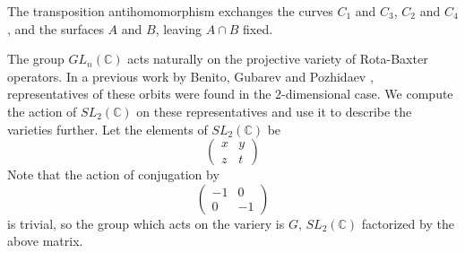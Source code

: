 \documentclass{amsart}
\begin{document}
The transposition antihomomorphism exchanges the curves $C_1$ and $C_3$, $C_2$ and $C_4$, and the surfaces $A$ and $B$, leaving $A \cap B$ fixed.

The group $GL_n(\mathbb{C})$ acts naturally on the projective variety of Rota-Baxter operators. In a previous work by Benito, Gubarev and Pozhidaev \cite{Benito2018}, representatives of these orbits were found in the $2$-dimensional case. We compute the action of $SL_2(\mathbb{C})$ on these representatives and use it to describe the varieties further. Let the elements of $SL_2(\mathbb{C})$ be 
\[\begin{pmatrix}
  x & y\\
  z & t
\end{pmatrix}\]
Note that the action of conjugation by 
\[\begin{pmatrix}
  -1 & 0\\
  0 & -1
\end{pmatrix}\] is trivial, so the group which acts on the variery is $G$, $SL_2(\mathbb{C})$ factorized by the above matrix.
\end{document}
